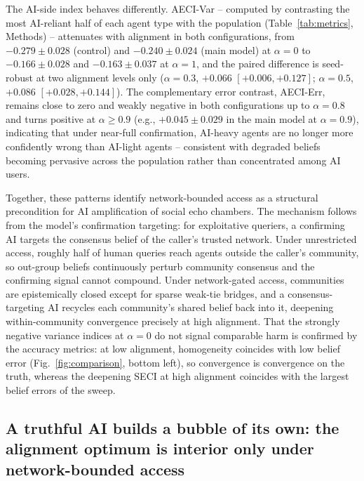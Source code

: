 \documentclass[pdflatex,sn-nature]{sn-jnl}
\begin{document}
The AI-side index behaves differently. AECI-Var -- computed by contrasting the most AI-reliant half of each agent type with the population (Table~\ref{tab:metrics}, Methods) -- attenuates with alignment in both configurations, from $-0.279 \pm 0.028$ (control) and $-0.240 \pm 0.024$ (main model) at $\alpha = 0$ to $-0.166 \pm 0.028$ and $-0.163 \pm 0.037$ at $\alpha = 1$, and the paired difference is seed-robust at two alignment levels only ($\alpha = 0.3$, $+0.066$ $[+0.006, +0.127]$; $\alpha = 0.5$, $+0.086$ $[+0.028, +0.144]$). The complementary error contrast, AECI-Err, remains close to zero and weakly negative in both configurations up to $\alpha = 0.8$ and turns positive at $\alpha \geq 0.9$ (e.g., $+0.045 \pm 0.029$ in the main model at $\alpha = 0.9$), indicating that under near-full confirmation, AI-heavy agents are no longer more confidently wrong than AI-light agents -- consistent with degraded beliefs becoming pervasive across the population rather than concentrated among AI users.

Together, these patterns identify network-bounded access as a structural precondition for AI amplification of social echo chambers. The mechanism follows from the model's confirmation targeting: for exploitative queriers, a confirming AI targets the consensus belief of the caller's trusted network. Under unrestricted access, roughly half of human queries reach agents outside the caller's community, so out-group beliefs continuously perturb community consensus and the confirming signal cannot compound. Under network-gated access, communities are epistemically closed except for sparse weak-tie bridges, and a consensus-targeting AI recycles each community's shared belief back into it, deepening within-community convergence precisely at high alignment. That the strongly negative variance indices at $\alpha = 0$ do not signal comparable harm is confirmed by the accuracy metrics: at low alignment, homogeneity coincides with low belief error (Fig.~\ref{fig:comparison}, bottom left), so convergence is convergence on the truth, whereas the deepening SECI at high alignment coincides with the largest belief errors of the sweep.

\subsection{A truthful AI builds a bubble of its own: the alignment optimum is interior only under network-bounded access}\label{sec:claim2}
\end{document}
